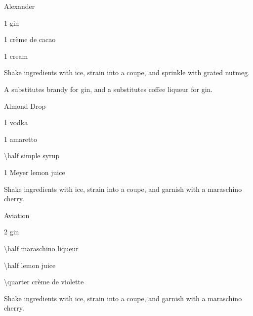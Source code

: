\begin{Cocktail}{Alexander}
	\begin{Ingredients}
	\item \SI{1}{\oz} gin
	\item \SI{1}{\oz} cr\`{e}me de cacao
	\item \SI{1}{\oz} cream
	\end{Ingredients}
	
	\begin{Instructions}
	Shake ingredients with ice, strain into a coupe, and sprinkle with grated nutmeg.
	
	A  substitutes brandy for gin, and a  substitutes coffee liqueur for gin.
	\end{Instructions}
\end{Cocktail}

\begin{Cocktail*}{Almond Drop}
	\begin{Ingredients}
	\item \SI{1}{\oz} vodka
	\item \SI{1}{\oz} amaretto
	\item \SI{\half}{\oz} simple syrup
	\item \SI{1}{\oz} Meyer lemon juice
	\end{Ingredients}
	
	\begin{Instructions}
	Shake ingredients with ice, strain into a coupe, and garnish with a maraschino cherry.
	\end{Instructions}
\end{Cocktail*}

\begin{Cocktail}{Aviation}
	\begin{Ingredients}
	\item \SI{2}{\oz} gin
	\item \SI{\half}{\oz} maraschino liqueur
	\item \SI{\half}{\oz} lemon juice
	\item \SI{\quarter}{\oz} cr\`{e}me de violette
	\end{Ingredients}
	
	\begin{Instructions}
	Shake ingredients with ice, strain into a coupe, and garnish with a maraschino cherry.
	\end{Instructions}
\end{Cocktail}

